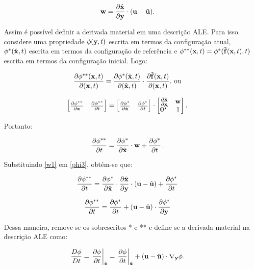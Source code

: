 \documentclass[_ArquivoPrincipal.tex]{subfiles}
\begin{document}
\begin{equation}
    \mathbf{w}=\frac{\partial{\hat{\mathbf{x}}}}{\partial{\mathbf{y}}}\cdot(\mathbf{u}-\hat{\mathbf{u}})\text{.}
    \label{w1}
\end{equation}

Assim é possível definir a derivada material em uma descrição ALE. Para isso considere uma propriedade $\phi(\mathbf{y},t)$ escrita em termos da configuração atual, $\phi^*(\hat{\mathbf{x}},t)$ escrita em termos da configuração de referência e $\phi^{**}(\mathbf{x},t)=\phi^*(\tilde{\mathbf{f}}(\mathbf{x},t),t)$ escrita em termos da configuração inicial. Logo:

\begin{equation}
    \frac{\partial{\phi^{**}(\mathbf{x},t)}}{\partial{(\mathbf{x},t)}}=\frac{\partial{\phi^*(\hat{\mathbf{x}},t)}}{\partial{(\hat{\mathbf{x}},t)}}\cdot\frac{\partial{\tilde{\mathbf{f}}(\mathbf{x},t)}}{\partial{(\mathbf{x},t)}}\text{, ou}
    \label{phi1}
\end{equation}

\begin{equation}
    \begin{bmatrix}\frac{\partial{\phi^{**}}}{\partial{\mathbf{x}}}&\frac{\partial{\phi^{**}}}{\partial{t}}\end{bmatrix}=
    \begin{bmatrix}\frac{\partial{\phi^{*}}}{\partial{\hat{\mathbf{x}}}}&\frac{\partial{\phi^{*}}}{\partial{t}}\end{bmatrix}\cdot
    \begin{bmatrix}\frac{\partial{\hat{\mathbf{x}}}}{\partial{\mathbf{x}}}&\mathbf{w}\\\mathbf{0}^T&1\end{bmatrix}
    \text{.}
    \label{phi2}
\end{equation}

\noindent Portanto:

\begin{equation}
    \frac{\partial{\phi^{**}}}{\partial{t}}=\frac{\partial{\phi^{*}}}{\partial{\hat{\mathbf{x}}}}\cdot\mathbf{w}+\frac{\partial{\phi^{*}}}{\partial{t}}\text{.}
    \label{phi3}
\end{equation}

Substituindo \ref{w1} em \ref{phi3}, obtém-se que:

\[\frac{\partial{\phi^{**}}}{\partial{t}}=\frac{\partial{\phi^{*}}}{\partial{\hat{\mathbf{x}}}}\cdot\frac{\partial{\hat{\mathbf{x}}}}{\partial{\mathbf{y}}}\cdot(\mathbf{u}-\hat{\mathbf{u}})+\frac{\partial{\phi^{*}}}{\partial{t}}\]

\[\frac{\partial{\phi^{**}}}{\partial{t}}=\frac{\partial{\phi^{*}}}{\partial{t}}+(\mathbf{u}-\hat{\mathbf{u}})\cdot\frac{\partial{\phi^{*}}}{\partial{\mathbf{y}}}\]

Dessa maneira, remove-se os sobrescritos * e ** e define-se a derivada material na descrição ALE como:

\begin{equation}
    \frac{D\phi}{Dt}=\left.\frac{\partial{\phi}}{\partial{t}}\right|_{\hat{\mathbf{x}}}=\left.\frac{\partial{\phi}}{\partial{t}}\right|_{\hat{\mathbf{x}}}+(\mathbf{u}-\hat{\mathbf{u}})\cdot\mathbf{\nabla_y}\phi\text{.}\label{DerMat2}
\end{equation}
\end{document}

